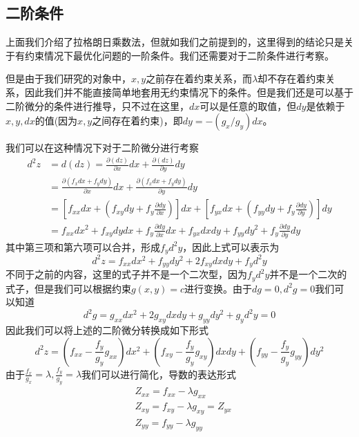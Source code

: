 \documentclass[UTF8,12pt]{ctexart}
\numberwithin{equation}{section} %
\numberwithin{figure}{section}
\numberwithin{table}{section}
\begin{document}
	\subsection{二阶条件}
	上面我们介绍了拉格朗日乘数法，但就如我们之前提到的，这里得到的结论只是关于有约束情况下最优化问题的一阶条件。我们还需要对于二阶条件进行考察。
	
	但是由于我们研究的对象中，$x,y$之前存在着约束关系，而$\lambda$却不存在着约束关系，因此我们并不能直接简单地套用无约束情况下的条件。但是我们还是可以基于二阶微分的条件进行推导，只不过在这里，$dx$可以是任意的取值，但$dy$是依赖于$x,y,dx$的值(因为$x,y$之间存在着约束)，即$dy = -(g_x/g_y)dx$。
	
	我们可以在这种情况下对于二阶微分进行考察
	\begin{equation}
		\begin{aligned}
			d^2z &= d(dz) = \frac{\partial(dz)}{\partial x}dx + \frac{\partial(dz)}{\partial y}dy \\
			&= \frac{\partial(f_xdx + f_ydy)}{\partial x}dx + \frac{\partial(f_xdx + f_ydy)}{\partial y}dy \\
			&= [f_{xx}dx + (f_{xy}dy + f_y\frac{\partial dy}{\partial x})]dx + [f_{yx}dx + (f_{yy}dy + f_y\frac{\partial dy}{\partial y})]dy \\
			&= f_{xx}dx^2 + f_{xy}dydx + f_y\frac{\partial dy}{\partial x}dx + f_{yx}dxdy + f_{yy}dy^2 + f_y\frac{\partial dy}{\partial y}dy
		\end{aligned}
	\end{equation}
	其中第三项和第六项可以合并，形成$f_yd^2y$，因此上式可以表示为
	\begin{equation}
		d^2z = f_{xx}dx^2 + f_{yy}dy^2 + 2f_{xy}dxdy + f_yd^2y
	\end{equation}
	不同于之前的内容，这里的式子并不是一个二次型，因为$f_yd^2y$并不是一个二次的式子，但是我们可以根据约束$g(x,y)=c$进行变换。由于$dg = 0,d^2g = 0$我们可以知道
	\begin{equation}
		d^2g = g_{xx}dx^2 + 2g_{xy}dxdy + g_{yy}dy^2 + g_yd^2y = 0
	\end{equation}
	因此我们可以将上述的二阶微分转换成如下形式
	\begin{equation}
		d^2z = (f_{xx} - \frac{f_y}{g_y}g_{xx})dx^2 + (f_{xy} - \frac{f_y}{g_y}g_{xy})dxdy + (f_{yy} - \frac{f_y}{g_y}g_{yy})dy^2
		\label{second-order differentiation}
	\end{equation}
	由于$\frac{f_x}{g_x} = \lambda,\frac{f_y}{g_y} = \lambda$我们可以进行简化，导数的表达形式
	\begin{equation}
		\begin{aligned}
			&Z_{xx} = f_{xx} - \lambda g_{xx}\\
			&Z_{xy} = f_{xy} - \lambda g_{xy} = Z_{yx}\\
			&Z_{yy} = f_{yy} - \lambda g_{yy}\\
		\end{aligned}
	\end{equation}
	
\end{document}
